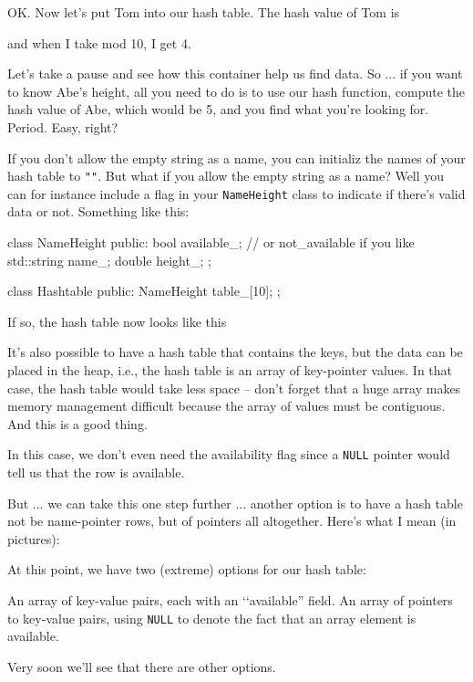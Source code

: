 OK. 
Now let's put Tom into our hash table.
The hash value of Tom is

and when I take mod 10, I get 4.



Let's take a pause and see how 
this container help us find data.
So ... if you want to know Abe's height,
all you need to do is to use our hash function, 
compute the hash value of Abe, which would be 5,
and you find what you're looking for.
Period.
Easy, right?

If you don't allow the empty string as a name,
you can initializ the names of your 
hash table to \verb!""!.
But what if you allow the empty string
as a name?
Well you can for instance include a flag in your
\verb!NameHeight! class to indicate if there's valid data or not.
Something like this:
{\small
\begin{console}
class NameHeight
{
public:
    bool available_; // or not_available if you like
    std::string name_;
    double height_;
};

class Hashtable
{
public:
    NameHeight table_[10];
};
\end{console}
}
If so, the hash table now looks like this




It's also possible to have a hash table that contains
the keys, but the 
data can be placed in the heap, i.e.,
the hash table is an array of key-pointer values.
In that case, the hash table would take less space --
don't forget that a huge array makes memory management
difficult because the array of values must be contiguous.
And this is a good thing.


In this case, we don't even need the availability flag since a
\verb!NULL! pointer would tell us that the row is available.

But ... we can take this one step further ...
another option is to have a hash table not be 
name-pointer rows,
but of pointers all altogether.
Here's what I mean (in pictures):



At this point, we have two (extreme) options for our hash table:
\begin{tightlist}
\li An array of key-value pairs, each with an \lq\lq available''
    field.
\li An array of pointers to key-value pairs, using \verb!NULL!
    to denote the fact that an array element is available.
\end{tightlist} 

Very soon we'll see that there are other options.





